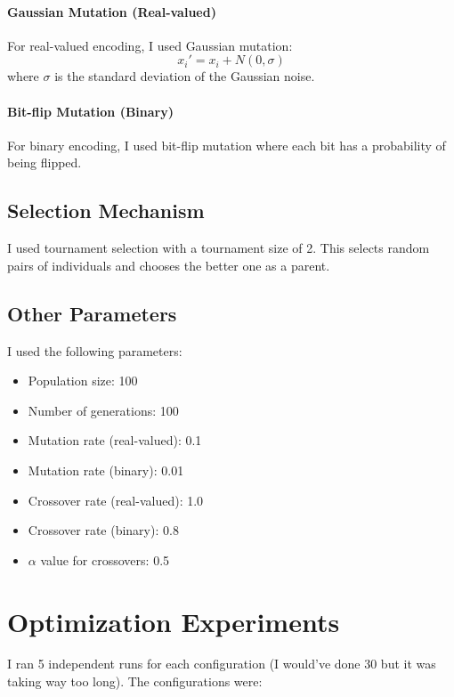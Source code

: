 \documentclass{article}
\begin{document}
\paragraph{Gaussian Mutation (Real-valued)}
For real-valued encoding, I used Gaussian mutation:
\begin{equation}
x_i' = x_i + N(0, \sigma)
\end{equation}
where $\sigma$ is the standard deviation of the Gaussian noise.

\paragraph{Bit-flip Mutation (Binary)}
For binary encoding, I used bit-flip mutation where each bit has a probability of being flipped.

\subsection{Selection Mechanism}
I used tournament selection with a tournament size of 2. This selects random pairs of individuals and chooses the better one as a parent.

\subsection{Other Parameters}
I used the following parameters:
\begin{itemize}
\item Population size: 100
\item Number of generations: 100
\item Mutation rate (real-valued): 0.1
\item Mutation rate (binary): 0.01
\item Crossover rate (real-valued): 1.0
\item Crossover rate (binary): 0.8
\item $\alpha$ value for crossovers: 0.5
\end{itemize}

\section{Optimization Experiments}
I ran 5 independent runs for each configuration (I would've done 30 but it was taking way too long). The configurations were:
\end{document}
